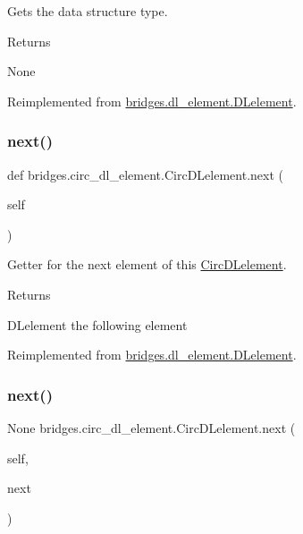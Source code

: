 Gets the data structure type. 

\begin{DoxyReturn}{Returns}


None 
\end{DoxyReturn}


Reimplemented from \mbox{\hyperlink{classbridges_1_1dl__element_1_1_d_lelement_a6ffddb5ac79a3945c1559dbc2236ab81}{bridges.\+dl\+\_\+element.\+D\+Lelement}}.

\mbox{\label{classbridges_1_1circ__dl__element_1_1_circ_d_lelement_a09b8b12344743709cce1d5fd926b88e9}} 
\subsubsection{\texorpdfstring{next()}{next()}\hspace{0.1cm}{\footnotesize\ttfamily [1/2]}}
{\footnotesize\ttfamily def bridges.\+circ\+\_\+dl\+\_\+element.\+Circ\+D\+Lelement.\+next (\begin{DoxyParamCaption}\item[{}]{self }\end{DoxyParamCaption})}



Getter for the next element of this \mbox{\hyperlink{classbridges_1_1circ__dl__element_1_1_circ_d_lelement}{Circ\+D\+Lelement}}. 

\begin{DoxyReturn}{Returns}


D\+Lelement the following element 
\end{DoxyReturn}


Reimplemented from \mbox{\hyperlink{classbridges_1_1dl__element_1_1_d_lelement_a43077e810ec453c9cd512ba75819e28a}{bridges.\+dl\+\_\+element.\+D\+Lelement}}.

\mbox{\label{classbridges_1_1circ__dl__element_1_1_circ_d_lelement_adb12e76948e7515f1987fc3bdbe0e861}} 
\subsubsection{\texorpdfstring{next()}{next()}\hspace{0.1cm}{\footnotesize\ttfamily [2/2]}}
{\footnotesize\ttfamily  None bridges.\+circ\+\_\+dl\+\_\+element.\+Circ\+D\+Lelement.\+next (\begin{DoxyParamCaption}\item[{}]{self,  }\item[{}]{next }\end{DoxyParamCaption})}



